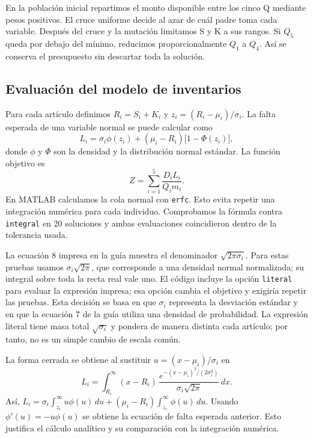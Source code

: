 \documentclass[conference]{IEEEtran}
\begin{document}
En la población inicial repartimos el monto disponible entre los cinco Q mediante pesos positivos. El cruce uniforme decide al azar de cuál padre toma cada variable. Después del cruce y la mutación limitamos S y K a sus rangos. Si $Q_5$ queda por debajo del mínimo, reducimos proporcionalmente $Q_1$ a $Q_4$. Así se conserva el presupuesto sin descartar toda la solución.

\subsection{Evaluación del modelo de inventarios}
Para cada artículo definimos $R_i=S_i+K_i$ y $z_i=(R_i-\mu_i)/\sigma_i$. La falta esperada de una variable normal se puede calcular como
\begin{equation}
L_i=\sigma_i\phi(z_i)+(\mu_i-R_i)\bigl[1-\Phi(z_i)\bigr],
\end{equation}
donde $\phi$ y $\Phi$ son la densidad y la distribución normal estándar. La función objetivo es
\begin{equation}
Z=\sum_{i=1}^{5}\frac{D_iL_i}{Q_i m_i}.
\end{equation}
En MATLAB calculamos la cola normal con \texttt{erfc}. Esto evita repetir una integración numérica para cada individuo. Comprobamos la fórmula contra \texttt{integral} en 20 soluciones y ambas evaluaciones coincidieron dentro de la tolerancia usada.

La ecuación 8 impresa en la guía muestra el denominador $\sqrt{2\pi\sigma_i}$. Para estas pruebas usamos $\sigma_i\sqrt{2\pi}$, que corresponde a una densidad normal normalizada; su integral sobre toda la recta real vale uno. El código incluye la opción \texttt{literal} para evaluar la expresión impresa; esa opción cambia el objetivo y exigiría repetir las pruebas. Esta decisión se basa en que $\sigma_i$ representa la desviación estándar y en que la ecuación 7 de la guía utiliza una densidad de probabilidad. La expresión literal tiene masa total $\sqrt{\sigma_i}$ y pondera de manera distinta cada artículo; por tanto, no es un simple cambio de escala común.

La forma cerrada se obtiene al sustituir $u=(x-\mu_i)/\sigma_i$ en
\begin{equation}
L_i=\int_{R_i}^{\infty}(x-R_i)\,
\frac{e^{-(x-\mu_i)^2/(2\sigma_i^2)}}{\sigma_i\sqrt{2\pi}}\,dx.
\end{equation}
Así, $L_i=\sigma_i\int_{z_i}^{\infty}u\phi(u)\,du+(\mu_i-R_i)\int_{z_i}^{\infty}\phi(u)\,du$. Usando $\phi'(u)=-u\phi(u)$ se obtiene la ecuación de falta esperada anterior. Esto justifica el cálculo analítico y su comparación con la integración numérica.
\end{document}
